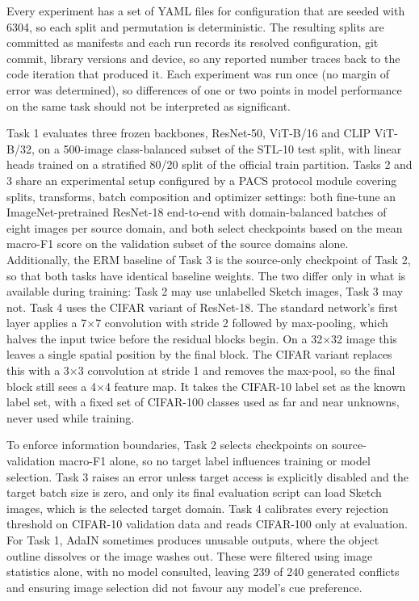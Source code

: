 \documentclass{article}
\begin{document}
Every experiment has a set of YAML files for configuration that are seeded
with 6304, so each split and permutation is deterministic. The resulting
splits are committed as manifests and each run records its resolved
configuration, git commit, library versions and device, so any reported
number traces back to the code iteration that produced it. Each experiment
was run once (no margin of error was determined), so differences of one or
two points in model performance on the same task should not be interpreted as
significant.

Task 1 evaluates three frozen backbones, ResNet-50, ViT-B/16 and CLIP
ViT-B/32, on a 500-image class-balanced subset of the STL-10 test split, with
linear heads trained on a stratified 80/20 split of the official train
partition. Tasks 2 and 3 share an experimental setup configured by a PACS
protocol module covering splits, transforms, batch composition and optimizer
settings: both fine-tune an ImageNet-pretrained ResNet-18 end-to-end with
domain-balanced batches of eight images per source domain, and both select
checkpoints based on the mean macro-F1 score on the validation subset of the
source domains alone. Additionally, the ERM baseline of Task 3 is the
source-only checkpoint of Task 2, so that both tasks have identical baseline
weights. The two differ only in what is available during training: Task 2 may
use unlabelled Sketch images, Task 3 may not. Task 4 uses the CIFAR variant
of ResNet-18. The standard network's first layer applies a 7$\times$7
convolution with stride 2 followed by max-pooling, which halves the input
twice before the residual blocks begin. On a 32$\times$32 image this leaves a
single spatial position by the final block. The CIFAR variant replaces this
with a 3$\times$3 convolution at stride 1 and removes the max-pool, so the
final block still sees a 4$\times$4 feature map. It takes the CIFAR-10 label
set as the known label set, with a fixed set of CIFAR-100 classes used as far
and near unknowns, never used while training.

To enforce information boundaries, Task 2 selects checkpoints on
source-validation macro-F1 alone, so no target label influences training or
model selection. Task 3 raises an error unless target access is explicitly
disabled and the target batch size is zero, and only its final evaluation
script can load Sketch images, which is the selected target domain. Task 4
calibrates every rejection threshold on CIFAR-10 validation data and reads
CIFAR-100 only at evaluation. For Task 1, AdaIN sometimes produces unusable
outputs, where the object outline dissolves or the image washes out. These
were filtered using image statistics alone, with no model consulted, leaving
239 of 240 generated conflicts and ensuring image selection did not favour
any model's cue preference.
\end{document}
